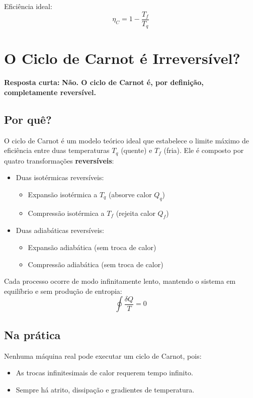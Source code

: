 Eficiência ideal:
\[
\boxed{
\eta_C = 1 - \frac{T_f}{T_q}
}
\]

\section*{O Ciclo de Carnot é Irreversível?}

\textbf{Resposta curta:} \textbf{Não. O ciclo de Carnot é, por definição, completamente reversível.}

\subsection*{Por quê?}

O ciclo de Carnot é um modelo teórico ideal que estabelece o limite máximo de eficiência entre duas temperaturas \( T_q \) (quente) e \( T_f \) (fria). Ele é composto por quatro transformações \textbf{reversíveis}:
\begin{itemize}
  \item Duas isotérmicas reversíveis:
    \begin{itemize}
      \item Expansão isotérmica a \( T_q \) (absorve calor \( Q_q \))
      \item Compressão isotérmica a \( T_f \) (rejeita calor \( Q_f \))
    \end{itemize}
  \item Duas adiabáticas reversíveis:
    \begin{itemize}
      \item Expansão adiabática (sem troca de calor)
      \item Compressão adiabática (sem troca de calor)
    \end{itemize}
\end{itemize}

Cada processo ocorre de modo infinitamente lento, mantendo o sistema em equilíbrio e sem produção de entropia:
\[
\oint \frac{\delta Q}{T} = 0
\]

\subsection*{Na prática}

Nenhuma máquina real pode executar um ciclo de Carnot, pois:
\begin{itemize}
  \item As trocas infinitesimais de calor requerem tempo infinito.
  \item Sempre há atrito, dissipação e gradientes de temperatura.
\end{itemize}

